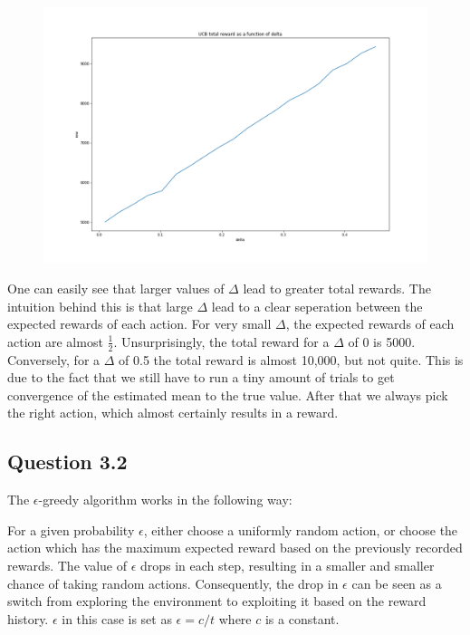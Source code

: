 \documentclass[a4paper, 11pt]{article} %
\begin{document}
\begin{figure}[H]
	\centering
	\includegraphics[scale = 0.4]{UCB_reward}
	\caption{}
\end{figure}

One can easily see that larger values of $\Delta$ lead to greater total rewards. The intuition behind this is that large $\Delta$ lead to a clear seperation between the expected rewards of each action. For very small $\Delta$, the expected rewards of each action are almost $\frac{1}{2}$. Unsurprisingly, the total reward for a $\Delta$ of 0 is 5000. Conversely, for a $\Delta$ of 0.5 the total reward is almost 10,000, but not quite. This is due to the fact that we still have to run a tiny amount of trials to get convergence of the estimated mean to the true value. After that we always pick the right action, which almost certainly results in a reward.

\subsection*{Question 3.2}

The $\epsilon$-greedy algorithm works in the following way:

For a given probability $\epsilon$, either choose a uniformly random action, or choose the action which has the maximum expected reward based on the previously recorded rewards. The value of $\epsilon$ drops in each step, resulting in a smaller and smaller chance of taking random actions. Consequently, the drop in $\epsilon$ can be seen as a switch from exploring the environment to exploiting it based on the reward history. $\epsilon$ in this case is set as $\epsilon = c/t$ where $c$ is a constant.
\end{document}
